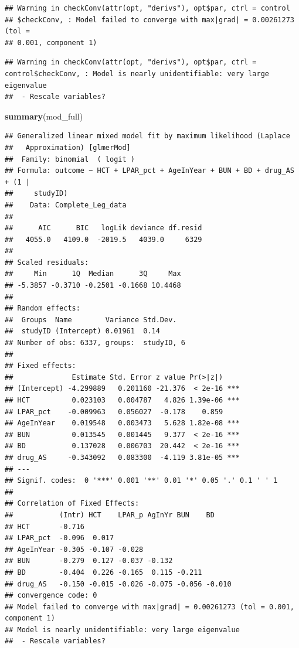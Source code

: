 \documentclass[]{article}
\newenvironment{Shaded}{\begin{snugshade}}{\end{snugshade}}
\newcommand{\KeywordTok}[1]{\textcolor[rgb]{0.13,0.29,0.53}{\textbf{#1}}}
\newcommand{\NormalTok}[1]{#1}
\begin{document}
\begin{verbatim}
## Warning in checkConv(attr(opt, "derivs"), opt$par, ctrl = control
## $checkConv, : Model failed to converge with max|grad| = 0.00261273 (tol =
## 0.001, component 1)
\end{verbatim}

\begin{verbatim}
## Warning in checkConv(attr(opt, "derivs"), opt$par, ctrl = control$checkConv, : Model is nearly unidentifiable: very large eigenvalue
##  - Rescale variables?
\end{verbatim}

\begin{Shaded}
\begin{Highlighting}[]
\KeywordTok{summary}\NormalTok{(mod_full)}
\end{Highlighting}
\end{Shaded}

\begin{verbatim}
## Generalized linear mixed model fit by maximum likelihood (Laplace
##   Approximation) [glmerMod]
##  Family: binomial  ( logit )
## Formula: outcome ~ HCT + LPAR_pct + AgeInYear + BUN + BD + drug_AS + (1 |  
##     studyID)
##    Data: Complete_Leg_data
## 
##      AIC      BIC   logLik deviance df.resid 
##   4055.0   4109.0  -2019.5   4039.0     6329 
## 
## Scaled residuals: 
##     Min      1Q  Median      3Q     Max 
## -5.3857 -0.3710 -0.2501 -0.1668 10.4468 
## 
## Random effects:
##  Groups  Name        Variance Std.Dev.
##  studyID (Intercept) 0.01961  0.14    
## Number of obs: 6337, groups:  studyID, 6
## 
## Fixed effects:
##              Estimate Std. Error z value Pr(>|z|)    
## (Intercept) -4.299889   0.201160 -21.376  < 2e-16 ***
## HCT          0.023103   0.004787   4.826 1.39e-06 ***
## LPAR_pct    -0.009963   0.056027  -0.178    0.859    
## AgeInYear    0.019548   0.003473   5.628 1.82e-08 ***
## BUN          0.013545   0.001445   9.377  < 2e-16 ***
## BD           0.137028   0.006703  20.442  < 2e-16 ***
## drug_AS     -0.343092   0.083300  -4.119 3.81e-05 ***
## ---
## Signif. codes:  0 '***' 0.001 '**' 0.01 '*' 0.05 '.' 0.1 ' ' 1
## 
## Correlation of Fixed Effects:
##           (Intr) HCT    LPAR_p AgInYr BUN    BD    
## HCT       -0.716                                   
## LPAR_pct  -0.096  0.017                            
## AgeInYear -0.305 -0.107 -0.028                     
## BUN       -0.279  0.127 -0.037 -0.132              
## BD        -0.404  0.226 -0.165  0.115 -0.211       
## drug_AS   -0.150 -0.015 -0.026 -0.075 -0.056 -0.010
## convergence code: 0
## Model failed to converge with max|grad| = 0.00261273 (tol = 0.001, component 1)
## Model is nearly unidentifiable: very large eigenvalue
##  - Rescale variables?
\end{verbatim}
\end{document}
